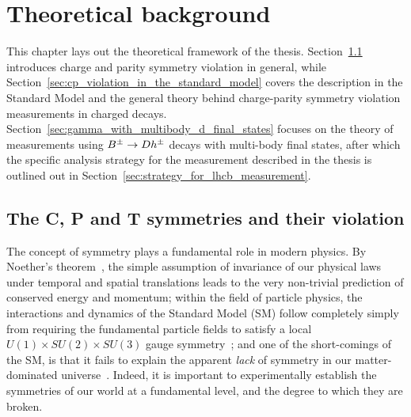 

\chapter{Theoretical background}
\label{ch:2-litreview}


This chapter lays out the theoretical framework of the thesis. Section~\ref{sec:the_c_and_p_symmetries_and_their_violation} introduces charge and parity symmetry violation in general, while Section~\ref{sec:cp_violation_in_the_standard_model} covers the description in the Standard Model and the general theory behind charge-parity symmetry violation measurements in charged \B decays. Section~\ref{sec:gamma_with_multibody_d_final_states} focuses on the theory of measurements using ${{B}^\pm}\rightarrow{\ensuremath{D}} h^\pm$ decays with multi-body \D final states, after which the specific analysis strategy for the measurement described in the thesis is outlined out in Section~\ref{sec:strategy_for_lhcb_measurement}.


\section{The C, P and T symmetries and their violation} %
\label{sec:the_c_and_p_symmetries_and_their_violation}

The concept of symmetry plays a fundamental role in modern physics. By Noether's theorem~\cite{noetherInvarianteVariationsprobleme1918}, the simple assumption of invariance of our physical laws under  temporal and spatial translations leads to the very non-trivial prediction of conserved energy and momentum; 
%
within the field of particle physics, the interactions and dynamics of the Standard Model (SM) follow completely simply from requiring the fundamental particle fields to satisfy a local $U(1)\times SU(2)\times SU(3)$ gauge symmetry~\cite{donoghueDynamicsStandardModel2014};  
%
 and one of the short-comings of the SM, is that it fails to explain the apparent \emph{lack} of symmetry in our matter-dominated universe~\cite{sakarovViolationCPInvariance1966}. 
 Indeed, it is important to experimentally establish the symmetries of our world at a fundamental level, and the degree to which they are broken.

